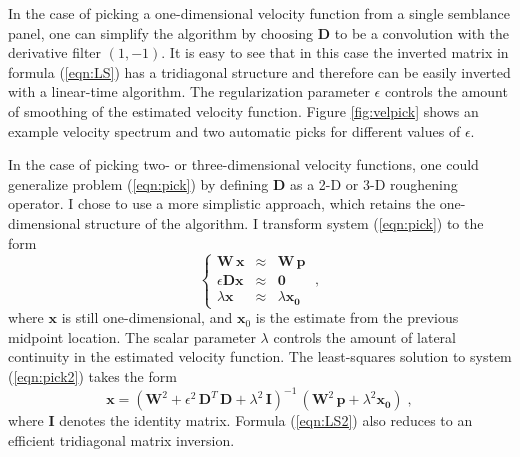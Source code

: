 
In the case of picking a one-dimensional velocity function from a single
semblance panel, one can simplify the algorithm by choosing $\mathbf{D}$ to be a
convolution with the derivative filter $(1,-1)$. It is easy to see that in
this case the inverted matrix in formula (\ref{eqn:LS}) has a tridiagonal
structure and therefore can be easily inverted with a linear-time algorithm.
The regularization parameter $\epsilon$ controls the amount of smoothing of
the estimated velocity function.  Figure \ref{fig:velpick} shows an example
velocity spectrum and two automatic picks for different values of $\epsilon$.


\par
In the case of picking two- or three-dimensional velocity functions,
one could generalize problem (\ref{eqn:pick}) by defining $\mathbf{D}$
as a 2-D or 3-D roughening operator. I chose to use a more simplistic
approach, which retains the one-dimensional structure of the algorithm. 
I transform system (\ref{eqn:pick}) to the form
\begin{equation}
  \label{eqn:pick2}
  \left\{\begin{array}{rcl}
      \mathbf{W}\,\mathbf{x} & \approx & \mathbf{W}\,\mathbf{p} \\
      \epsilon \mathbf{D} \mathbf{x} & \approx & \mathbf{0} \\
      \lambda \mathbf{x} & \approx & \lambda \mathbf{x_0}
    \end{array}\right.\;,
\end{equation}
where $\mathbf{x}$ is still one-dimensional, and $\mathbf{x}_0$ is the
estimate from the previous midpoint location. The scalar parameter
$\lambda$ controls the amount of lateral continuity in the estimated
velocity function. The least-squares solution to system
(\ref{eqn:pick2}) takes the form
\begin{equation}
  \label{eqn:LS2}
  \mathbf{x} = 
  \left(\mathbf{W}^2 + \epsilon^2\,\mathbf{D}^T\,\mathbf{D}
    + \lambda^2\,\mathbf{I}\right)^{-1}\,
  \left(\mathbf{W}^2\,\mathbf{p} + \lambda^2 \mathbf{x_0}\right)\;,
\end{equation}
where $\mathbf{I}$ denotes the identity matrix. Formula (\ref{eqn:LS2})
also reduces to an efficient tridiagonal matrix inversion.

